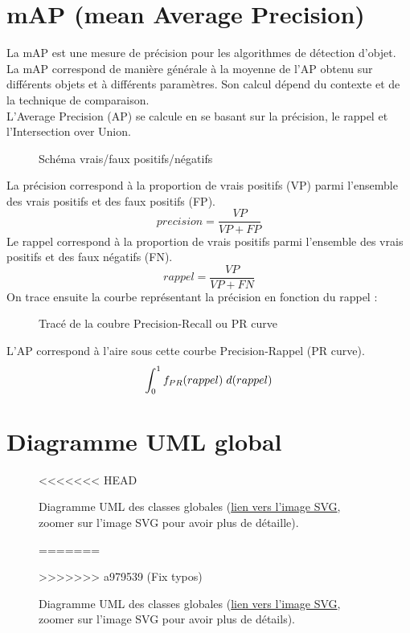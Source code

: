 \begin{appendices}
	
\section*{mAP (mean Average Precision)}\label{app:mAP}
La mAP est une mesure de précision pour les algorithmes de détection d'objet. La mAP correspond de manière générale à la moyenne de l'AP obtenu sur différents objets et à différents paramètres. Son calcul dépend du contexte et de la technique de comparaison.\\
L'Average Precision (AP) se calcule en se basant sur la précision, le rappel et l'Intersection over Union. 
\begin{figure}[!htbp]
\center
\caption{Schéma vrais/faux positifs/négatifs}
\label{fig:schema_vraifaux}
\end{figure}
\FloatBarrier
La précision correspond à la proportion de vrais positifs (VP) parmi l'ensemble des vrais positifs et des faux positifs (FP). 
$$precision = \frac{VP}{VP+FP}$$
Le rappel correspond à la proportion de vrais positifs parmi l'ensemble des vrais positifs et des faux négatifs (FN).
$$rappel = \frac{VP}{VP+FN}$$
On trace ensuite la courbe représentant la précision en fonction du rappel : 
\begin{figure}[!htbp]
\center
\caption{Tracé de la coubre Precision-Recall ou PR curve}
\label{fig:trace_prcurve}
\end{figure}
\FloatBarrier
L'AP correspond à l'aire sous cette courbe Precision-Rappel (PR curve). 
$$\int_{0}^{1} f_{PR}(rappel) \hspace{0.1cm} d(rappel)$$

	

	
\clearpage
\section*{Diagramme UML global}\label{app:UMLGlobal}
\begin{figure}[!htbp]
	\center
<<<<<<< HEAD
	\caption{Diagramme UML des classes globales (\href{https://raw.githubusercontent.com/gabriel-combe/Cuttlefish_Tracker/main/rapport/UML/classes.svg}{lien vers l'image SVG}, zoomer sur l'image SVG pour avoir plus de détaille).}
=======
	\caption{Diagramme UML des classes globales (\href{https://raw.githubusercontent.com/gabriel-combe/Cuttlefish_Tracker/main/rapport/UML/classes.svg}{lien vers l'image SVG}, zoomer sur l'image SVG pour avoir plus de détails).}
>>>>>>> a979539 (Fix typos)
	\label{fig:uml_diagram_classes}
\end{figure}
\FloatBarrier
	


\end{appendices}
